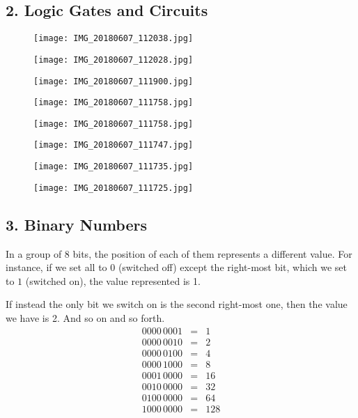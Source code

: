 \documentclass{article}
\begin{document}
\subsection{2. Logic Gates and Circuits}
\begin{figure}[H]
\texttt{[image: IMG\_20180607\_112038.jpg]}
\end{figure}
\begin{figure}[H]
\texttt{[image: IMG\_20180607\_112028.jpg]}
\end{figure}
\begin{figure}[H]
\texttt{[image: IMG\_20180607\_111900.jpg]}
\end{figure}
\begin{figure}[H]
\texttt{[image: IMG\_20180607\_111758.jpg]}
\end{figure}
\begin{figure}[H]
\texttt{[image: IMG\_20180607\_111758.jpg]}
\end{figure}
\begin{figure}[H]
\texttt{[image: IMG\_20180607\_111747.jpg]}
\end{figure}
\begin{figure}[H]
\texttt{[image: IMG\_20180607\_111735.jpg]}
\end{figure}
\begin{figure}[H]
\texttt{[image: IMG\_20180607\_111725.jpg]}
\end{figure}

\subsection{3. Binary Numbers}
In a group of 8 bits, the position of each of them represents a
different value. For instance, if we set all to $0$ (switched off)
except the right-most bit, which we set to $1$ (switched on), the
value represented is 1.

If instead the only bit we switch on is the second right-most one, then
the value we have is 2. And so on and so forth.
\begin{eqnarray*}
0000\,0001 &=& 1 \\
0000\,0010 &=& 2 \\
0000\,0100 &=& 4 \\
0000\,1000 &=& 8 \\
0001\,0000 &=& 16 \\
0010\,0000 &=& 32\\
0100\,0000 &=& 64\\
1000\,0000 &=& 128 
\end{eqnarray*}
\end{document}

